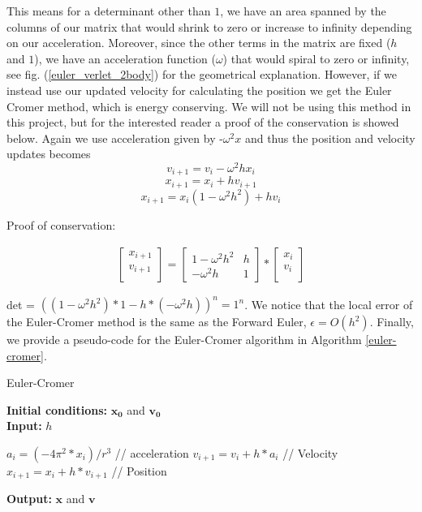 \documentclass[a4paper]{article}
\begin{document}
\begin{appendix}
This means for a determinant other than $1$, we have an area spanned by the columns of our matrix that would shrink to zero or increase to infinity depending on our acceleration. Moreover, since the other terms in the matrix are fixed ($h$ and $1$), we have an acceleration function ($\omega$) that would spiral to zero or infinity, see fig. (\ref{euler_verlet_2body}) for the geometrical explanation. However, if we instead use our updated velocity for calculating the position we get the Euler Cromer method, which is energy conserving. We will not be using this method in this project, but for the interested reader a proof of the conservation is showed below. Again we use acceleration given by -$\omega^2x$ and thus the position and velocity updates becomes
\begin{equation}
v_{i+1} = v_{i} - \omega^2hx_{i}
\end{equation}
\begin{equation}
x_{i+1} = x_{i} + hv_{i+1}
\end{equation}
\begin{equation}
x_{i+1} = x_{i}(1 - \omega^2h^2) + hv_{i}
\end{equation}

Proof of conservation:

\begin{align}
    \begin{bmatrix}
    x_{i+1} \\ v_{i+1} \\
  \end{bmatrix}
  =
    \begin{bmatrix}
        1 - \omega^2h^2 & h \\
        - \omega^2h & 1 
    \end{bmatrix}
    *
    \begin{bmatrix}
    x_i \\ v_i \\
  \end{bmatrix}
\end{align}


det = $( (1 - \omega^2h^2) * 1 - h* (-\omega^2h))^{n} = 1^n$. We notice that the local error of the Euler-Cromer method is the same as the Forward Euler, $\epsilon = O(h^2)$. Finally, we provide a pseudo-code for the Euler-Cromer algorithm in Algorithm \ref{euler-cromer}.

\begin{algorithm}[H]
\caption{Euler-Cromer}
\textbf{Initial conditions:} $\mathbf{x_0}$ and $\mathbf{v_0}$ \\
\textbf{Input:} $h$
\begin{algorithmic}[1]
\State $a_{i} = (-4\pi^2 * x_i) / r^3 $ \qquad// acceleration 
\State $v_{i+1}=v_{i} + h*a_{i}$ \qquad// Velocity
\State $x_{i+1}=x_{i} + h*v_{i+1}$ \qquad// Position
\EndFor
\EndWhile
\end{algorithmic}
\textbf{Output:} $\mathbf{x}$ and $\mathbf{v}$
\label{euler-cromer}
\end{algorithm}



\end{appendix}
\end{document}
